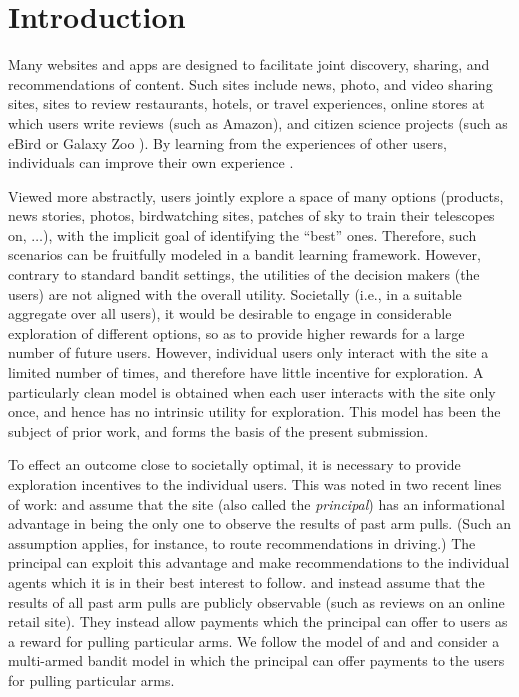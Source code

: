 \section{Introduction}

Many websites and apps are designed to facilitate joint discovery,
sharing, and recommendations of content.
Such sites include news, photo, and video sharing sites,
sites to review restaurants, hotels, or travel experiences,
online stores at which users write reviews (such as Amazon),
and citizen science projects
(such as eBird \citep{sullivan2009ebird,xue-ebird} or Galaxy Zoo \citep{lintott-galaxy-zoo}).
By learning from the experiences of other users, individuals can
improve their own experience \citep{schmit2017human}.

Viewed more abstractly, users jointly explore a space of
many options (products, news stories, photos, birdwatching sites,
patches of sky to train their telescopes on, $\ldots$),
with the implicit goal of identifying the ``best'' ones.
Therefore, such scenarios can be fruitfully modeled in a bandit
learning framework.
However, contrary to standard bandit settings, the utilities of the
decision makers (the users) are not aligned with the overall utility.
Societally (i.e., in a suitable aggregate over all users),
it would be desirable to engage in considerable exploration of
different options, so as to provide higher rewards for a large number
of future users.
However, individual users only interact with the site a limited number
of times, and therefore have little incentive for exploration.
A particularly clean model is obtained when each user interacts with the
site only once, and hence has no intrinsic utility for exploration. 
This model has been the subject of prior work, and forms the basis of
the present submission.

To effect an outcome close to societally optimal,
it is necessary to provide exploration incentives to the individual users.
This was noted in two recent lines of work:
\citet{kremer2014implementing}
and \citet{mansour2015bayesian,mansour2016bayesian}
assume that the site (also called the \emph{principal}) has an
informational advantage in being the only one to observe the results
of past arm pulls.
(Such an assumption applies, for instance, to route recommendations in
driving.)
The principal can exploit this advantage and make recommendations to
the individual agents which it is in their best interest to follow.
\citet{frazier2014incentivizing} and 
\citet{han2015incentivizing} instead assume that the results of all
past arm pulls are publicly observable
(such as reviews on an online retail site).
They instead allow payments which the principal can offer to users as
a reward for pulling particular arms.
We follow the model of \citet{frazier2014incentivizing} and
\citet{han2015incentivizing} 
and consider a multi-armed bandit model in which the principal can
offer payments to the users for pulling particular arms.

